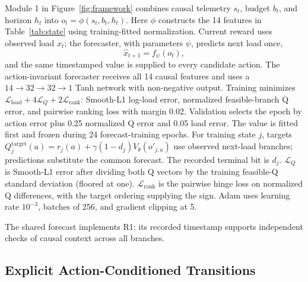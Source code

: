 \documentclass[acmsmall,screen,review,anonymous]{acmart}
\begin{document}
Module 1 in Figure~\ref{fig:framework} combines causal telemetry \(s_t\),
budget \(b_t\), and horizon \(h_t\) into \(o_t=\phi(s_t,b_t,h_t)\).
Here \(\phi\) constructs the 14 features in Table~\ref{tab:state} using
training-fitted normalization. Current reward uses observed load \(x_t\);
the forecaster, with parameters \(\psi\), predicts next load once,
\begin{equation}
  \widehat x_{t+1}=f_\psi(o_t),
\end{equation}
and the same timestamped value is supplied to every candidate action.  The
action-invariant forecaster receives all 14 causal features and uses a
\(14\!\rightarrow\!32\!\rightarrow\!32\!\rightarrow\!1\) Tanh network with
non-negative output.  Training minimizes
\(\mathcal L_{\mathrm{load}}+4\mathcal L_Q+2\mathcal L_{\mathrm{rank}}\):
Smooth-L1 log-load error, normalized feasible-branch Q error, and pairwise
ranking loss with margin 0.02.  Validation selects the epoch by action error
plus 0.25 normalized Q error and 0.05 load error.
The value is fitted first and frozen during 24 forecast-training epochs.
For training state \(j\), targets
\mbox{\(Q_j^\mathrm{target}(a)=r_j(a)+\gamma(1-d_j)V_\theta(o'_{j,a})\)}
use observed next-load branches; predictions substitute the common forecast.
The recorded terminal bit is \(d_j\).
\(\mathcal L_Q\) is Smooth-L1 error after dividing both Q vectors by the
training feasible-Q standard deviation (floored at one).
\(\mathcal L_{\mathrm{rank}}\) is the pairwise hinge loss on normalized
Q differences, with the target ordering supplying the sign. Adam uses
learning rate \(10^{-3}\), batches of 256, and gradient clipping at 5.

The shared forecast implements R1; its recorded timestamp supports independent
checks of causal context across all branches.

\subsection{Explicit Action-Conditioned Transitions}
\end{document}
